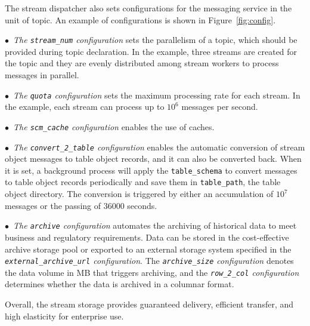 The stream dispatcher also sets configurations for the messaging service in the unit of topic. An example of  configurations is shown in Figure~\ref{fig:config}.



$\bullet$~\textit{The \texttt{stream\_num} configuration} sets the parallelism of a topic, which should be provided during topic declaration. In the example, three streams are created for the topic and they are evenly distributed among stream workers to process messages in parallel.

$\bullet$~\textit{The \texttt{quota} configuration} sets the maximum processing rate for each stream. In the example, each stream can process up to $10^6$ messages per second.

$\bullet$~\textit{The \texttt{scm\_cache} configuration} enables the use of  caches.

$\bullet$~\textit{The \texttt{convert\_2\_table} configuration} enables the automatic conversion of stream object messages to table object records, and it can also be converted back. When it is set, a background process will apply the \texttt{table\_schema} to convert messages to table object records periodically and save them in \texttt{table\_path}, \ie the table object directory. The conversion is triggered by either an accumulation of $10^7$ messages or the passing of 36000 seconds. 


$\bullet$~\textit{The \texttt{archive} configuration} automates the archiving of historical data to meet business and regulatory requirements. Data can be stored in the cost-effective \sys archive storage pool or exported to an external storage system specified in the \textit{\texttt{external\_archive\_url} configuration}. The \textit{\texttt{archive\_size} configuration} denotes the data volume in MB that triggers archiving, and the \textit{\texttt{row\_2\_col} configuration} determines whether the data is archived in a columnar format.

Overall, the \sys stream storage provides guaranteed delivery, efficient transfer, and high elasticity for enterprise use.


